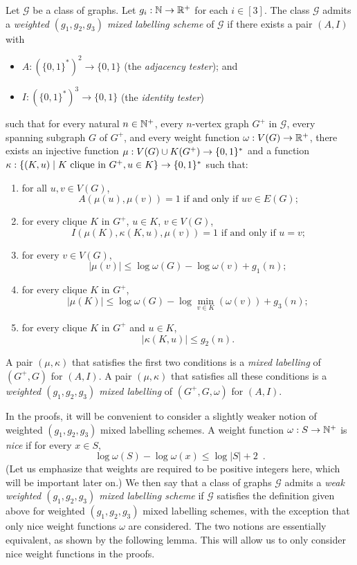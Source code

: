 \documentclass{patmorin}
\renewcommand{\le}{\leqslant}
\renewcommand{\leq}{\leqslant}
\newcommand{\defin}[1]{\emph{\textcolor{brightmaroon}{#1}}}
\DeclarePairedDelimiter{\set}{\{}{\}}
\begin{document}
Let $\mathcal{G}$ be a class of graphs.
Let $g_i:\mathbb{N}\to\mathbb{R}^+$ for each $i\in[3]$.
The class  $\mathcal{G}$ admits a \defin{weighted $(g_1,g_2,g_3)$ mixed labelling scheme} of $\mathcal{G}$ if there exists a pair $(A,I)$ with
\begin{itemize}[nosep,nolistsep]
     \item $A:(\{0,1\}^*)^2\to\{0,1\}$ (the \defin{adjacency tester}); and
     \item $I:(\{0,1\}^*)^3\to\{0,1\}$ (the \defin{identity tester})
\end{itemize}
such that
for every natural $n\in\mathbb{N}^+$,
every $n$-vertex graph $G^+$ in $\mathcal{G}$,
every spanning subgraph $G$ of $G^+$, and
every weight function $\omega:V(G)\to \mathbb{R}^+$,
there exists an injective function $\mu: V(G)\cup K(G^+) \to \set{0,1}^*$ and a function $\kappa:\{(K, u)\mid \textrm{$K$ clique in $G^+$}, u\in K\}\to \set{0,1}^*$
such that:
\begin{enumerate}[nosep,nolistsep,label=(\roman*)]
    \item for all $u,v\in V(G)$,
    \[
    \textrm{$A(\mu(u),\mu(v))=1$ if and only if $uv\in E(G)$;}
    \]
    \item for every clique $K$ in $G^+$, $u\in K$, $v\in V(G)$,
    \[
    \textrm{$I(\mu(K),\kappa(K, u),\mu(v))=1$ if and only if $u=v$;}
    \]
    \item for every $v\in V(G)$,
    \[
    |\mu(v)| \leq \log \omega(G) - \log\omega(v) + g_1(n);
    \]
    \item for every clique $K$ in $G^+$,
    \[
    |\mu(K)|\le \log \omega(G) - \log\min_{v\in K}(\omega(v)) + g_3(n);
    \]
    \item  for every clique $K$ in $G^+$ and $u\in K$,
    \[
    |\kappa(K, u)| \leq g_2(n).
    \]
\end{enumerate}
A pair $(\mu,\kappa)$ that satisfies the first two conditions is a \defin{mixed labelling} of $(G^+,G)$ for $(A,I)$.  A pair $(\mu,\kappa)$ that satisfies all these conditions is a \defin{weighted $(g_1,g_2,g_3)$ mixed labelling} of $(G^+,G,\omega)$ for $(A,I)$.

In the proofs, it will be convenient to consider a slightly weaker notion of weighted $(g_1,g_2,g_3)$ mixed labelling schemes.
A weight function $\omega:S\to \mathbb{N}^+$ is \defin{nice} if
for every $x\in S$,
\[
  \log \omega(S) - \log \omega(x) \leq \log |S| + 2\enspace.
\]
(Let us emphasize that weights are required to be positive integers here, which will be important later on.)
We then say that a class of graphs $\mathcal{G}$ admits a \defin{weak weighted $(g_1,g_2,g_3)$ mixed labelling scheme} if $\mathcal{G}$ satisfies the definition given above for weighted $(g_1,g_2,g_3)$ mixed labelling schemes, with the exception that only nice weight functions $\omega$ are considered.
The two notions are essentially equivalent, as shown by the following lemma. This will allow us to only consider nice weight functions in the proofs.
\end{document}
